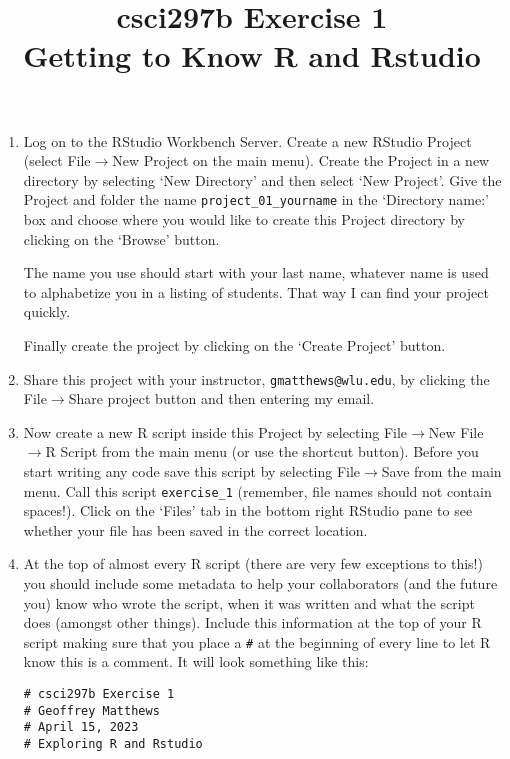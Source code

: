 \documentclass[12pt]{article}
\title{csci297b Exercise 1\\ Getting to Know R and Rstudio}
\date{}
\newcommand{\arrow}{\ensuremath{\rightarrow}}
\begin{document}
\maketitle

\begin{enumerate}

\item Log on to the RStudio Workbench Server. 
Create a new RStudio Project (select File\arrow New Project on the main menu). Create the Project in a new directory by selecting ‘New Directory’ and then select ‘New Project’. Give the Project and folder the name \verb|project_01_yourname| in the ‘Directory name:’ box and 
choose where you would like to create this Project directory by clicking on the ‘Browse’ button.

The name you use should start with your last name, whatever name is used to alphabetize
you in a listing of students.  That way I can find your project quickly.

 Finally create the project by clicking on the ‘Create Project’ button. 

\item Share this project with your instructor, \verb|gmatthews@wlu.edu|, by
clicking the File\arrow Share project button and then entering my email.
 

\item Now create a new R script inside this Project by selecting File\arrow New File\arrow R Script from the main menu (or use the shortcut button). Before you start writing any code save this script by selecting File\arrow Save from the main menu. Call this script \verb|exercise_1|  (remember, file names should not contain spaces!). Click on the ‘Files’ tab in the bottom right RStudio pane to see whether your file has been saved in the correct location.

\item At the top of almost every R script (there are very few exceptions to this!) you should include some metadata to help your collaborators (and the future you) know who wrote the script, when it was written and what the script does (amongst other things). Include this information at the top of your R script making sure that you place a \lstinline{#} at the beginning of every line to let R know this is a comment. 
It will look something like this:
\begin{lstlisting}
# csci297b Exercise 1
# Geoffrey Matthews
# April 15, 2023
# Exploring R and Rstudio
\end{lstlisting}


\end{enumerate}
\end{document}
